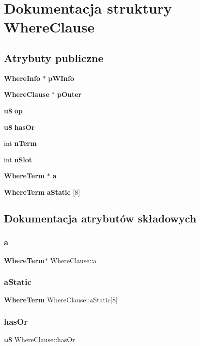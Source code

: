 \section{Dokumentacja struktury Where\+Clause}
\label{struct_where_clause}
\subsection*{Atrybuty publiczne}
\begin{DoxyCompactItemize}
\item 
\textbf{ Where\+Info} $\ast$ \textbf{ p\+W\+Info}
\item 
\textbf{ Where\+Clause} $\ast$ \textbf{ p\+Outer}
\item 
\textbf{ u8} \textbf{ op}
\item 
\textbf{ u8} \textbf{ has\+Or}
\item 
int \textbf{ n\+Term}
\item 
int \textbf{ n\+Slot}
\item 
\textbf{ Where\+Term} $\ast$ \textbf{ a}
\item 
\textbf{ Where\+Term} \textbf{ a\+Static} [8]
\end{DoxyCompactItemize}


\subsection{Dokumentacja atrybutów składowych}
\mbox{\label{struct_where_clause_a140d726a3e20ac7b6853d539c59add72}} 
\subsubsection{a}
{\footnotesize\ttfamily \textbf{ Where\+Term}$\ast$ Where\+Clause\+::a}

\mbox{\label{struct_where_clause_a4acb8640bc9f42752900de5735bcd8e0}} 
\subsubsection{aStatic}
{\footnotesize\ttfamily \textbf{ Where\+Term} Where\+Clause\+::a\+Static[8]}

\mbox{\label{struct_where_clause_ab4385fc1d8f21dce3b43cdae28d67d9a}} 
\subsubsection{hasOr}
{\footnotesize\ttfamily \textbf{ u8} Where\+Clause\+::has\+Or}

